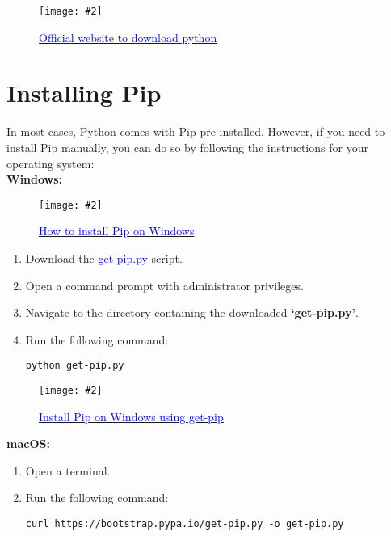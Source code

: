 \documentclass[a4paper, 12pt]{report}
\newcommand{\commandbox}[1]{%
    \begin{tcolorbox}[colback=green!10, colframe=green!50!black, rounded corners]
        #1
    \end{tcolorbox}%
}
\newcommand{\addimage}[4][]{%
    \begin{figure}[ht]
        \centering
        \texttt{[image: \#2]}
        \caption{#3}
        \label{#4}
    \end{figure}%
}
\begin{document}
        \addimage[width=0.8\textwidth]{pythonwebsite.png}{\href{https://www.python.org/downloads/}{\textcolor{blue}{Official website to download python}}}{fig:python website}

    \newpage

    
    \section{Installing Pip}
        In most cases, Python comes with Pip pre-installed. However, if you need to install Pip manually, you can do so by following the instructions for your operating system:\\

        \textbf{Windows:}

        \addimage[width=0.8\textwidth]{PipOnWindows.jpeg}{\href{https://th.bing.com/th/id/OIP.PbcC89a1KSoYHLKVORN7ogAAAA?pid=ImgDet&rs=1}{\textcolor{blue}{How to install Pip on Windows}}}{fig:install pip on windows}
        
        \begin{enumerate}        
            \item Download the \href{https://bootstrap.pypa.io/get-pip.py}{\textcolor{blue}{get-pip.py}} script.
            \item Open a command prompt with administrator privileges.
            \item Navigate to the directory containing the downloaded \textbf{`get-pip.py'}.
            \item Run the following command:
            \commandbox{\texttt{python get-pip.py}}
            
        \end{enumerate}

        \addimage[width=0.8\textwidth]{getPip.png}{\href{https://www.jesusninoc.com/wp-content/uploads/2017/07/Installing-pip-with-get-pip-py.png}{\textcolor{blue}{Install Pip on Windows using get-pip}}}{fig:Windows get-pip}

        \newpage

        \textbf{macOS:}
            \begin{enumerate}
                \item Open a terminal.
                \item Run the following command:
                \commandbox{\texttt{curl https://bootstrap.pypa.io/get-pip.py -o get-pip.py}}
            \end{enumerate}
\end{document}
